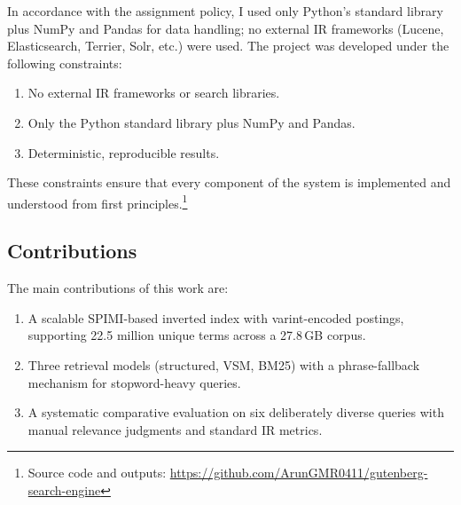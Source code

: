 \documentclass[sigconf,nonacm]{acmart}
\begin{document}
In accordance with the assignment policy, I used only Python's standard
library plus NumPy and Pandas for data handling; no external IR
frameworks (Lucene, Elasticsearch, Terrier, Solr, etc.) were used.
The project was developed under the following constraints:
\begin{enumerate}[nosep]
  \item No external IR frameworks or search libraries.
  \item Only the Python standard library plus NumPy and Pandas.
  \item Deterministic, reproducible results.
\end{enumerate}
These constraints ensure that every component of the system is implemented and
understood from first principles.\footnote{Source code and outputs:
\url{https://github.com/ArunGMR0411/gutenberg-search-engine}}

\subsection{Contributions}
The main contributions of this work are:
\begin{enumerate}[nosep]
  \item A scalable SPIMI-based inverted index with varint-encoded postings,
        supporting 22.5 million unique terms across a 27.8\,GB corpus.
  \item Three retrieval models (structured, VSM, BM25) with a phrase-fallback
        mechanism for stopword-heavy queries.
  \item A systematic comparative evaluation on six deliberately diverse queries
        with manual relevance judgments and standard IR metrics.
\end{enumerate}
\end{document}
